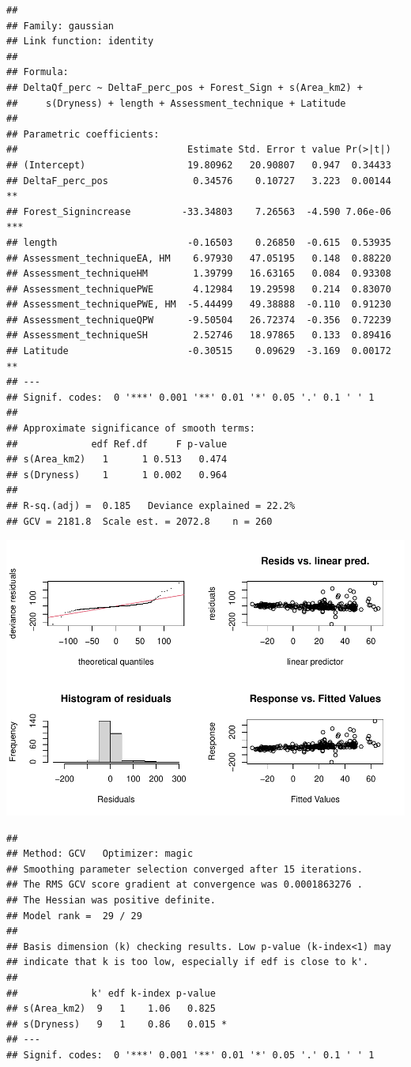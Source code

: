 \documentclass[]{elsarticle} %
\begin{document}
\begin{verbatim}
## 
## Family: gaussian 
## Link function: identity 
## 
## Formula:
## DeltaQf_perc ~ DeltaF_perc_pos + Forest_Sign + s(Area_km2) + 
##     s(Dryness) + length + Assessment_technique + Latitude
## 
## Parametric coefficients:
##                              Estimate Std. Error t value Pr(>|t|)    
## (Intercept)                  19.80962   20.90807   0.947  0.34433    
## DeltaF_perc_pos               0.34576    0.10727   3.223  0.00144 ** 
## Forest_Signincrease         -33.34803    7.26563  -4.590 7.06e-06 ***
## length                       -0.16503    0.26850  -0.615  0.53935    
## Assessment_techniqueEA, HM    6.97930   47.05195   0.148  0.88220    
## Assessment_techniqueHM        1.39799   16.63165   0.084  0.93308    
## Assessment_techniquePWE       4.12984   19.29598   0.214  0.83070    
## Assessment_techniquePWE, HM  -5.44499   49.38888  -0.110  0.91230    
## Assessment_techniqueQPW      -9.50504   26.72374  -0.356  0.72239    
## Assessment_techniqueSH        2.52746   18.97865   0.133  0.89416    
## Latitude                     -0.30515    0.09629  -3.169  0.00172 ** 
## ---
## Signif. codes:  0 '***' 0.001 '**' 0.01 '*' 0.05 '.' 0.1 ' ' 1
## 
## Approximate significance of smooth terms:
##             edf Ref.df     F p-value
## s(Area_km2)   1      1 0.513   0.474
## s(Dryness)    1      1 0.002   0.964
## 
## R-sq.(adj) =  0.185   Deviance explained = 22.2%
## GCV = 2181.8  Scale est. = 2072.8    n = 260
\end{verbatim}

\includegraphics{Forest_and_Water_files/figure-latex/model5-1.pdf}

\begin{verbatim}
## 
## Method: GCV   Optimizer: magic
## Smoothing parameter selection converged after 15 iterations.
## The RMS GCV score gradient at convergence was 0.0001863276 .
## The Hessian was positive definite.
## Model rank =  29 / 29 
## 
## Basis dimension (k) checking results. Low p-value (k-index<1) may
## indicate that k is too low, especially if edf is close to k'.
## 
##             k' edf k-index p-value  
## s(Area_km2)  9   1    1.06   0.825  
## s(Dryness)   9   1    0.86   0.015 *
## ---
## Signif. codes:  0 '***' 0.001 '**' 0.01 '*' 0.05 '.' 0.1 ' ' 1
\end{verbatim}
\end{document}
